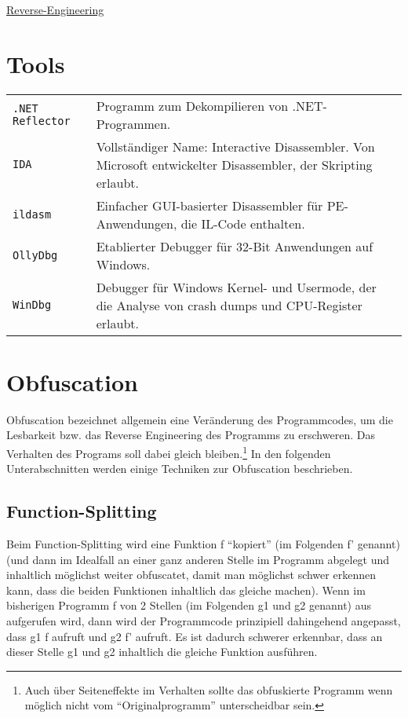 \begin{center}
     \Large{\underline{Reverse-Engineering}} \\
\end{center}

\section{Tools}
\begin{tabular}{@{}p{\the\MyLen}
		@{}p{\linewidth-\the\MyLen}@{}}
	\texttt{.NET Reflector} & Programm zum Dekompilieren von .NET-Programmen.\\
	\texttt{IDA} &  Vollständiger Name: Interactive Disassembler. Von Microsoft entwickelter Disassembler, der Skripting erlaubt. \\
	\texttt{ildasm} & Einfacher GUI-basierter Disassembler für PE-Anwendungen, die IL-Code enthalten.\\
	\texttt{OllyDbg} & Etablierter Debugger für 32-Bit Anwendungen auf Windows.\\
	\texttt{WinDbg} & Debugger für Windows Kernel- und Usermode, der die Analyse von crash dumps und CPU-Register erlaubt.\\
\end{tabular}
\section{Obfuscation}
Obfuscation bezeichnet allgemein eine Veränderung des Programmcodes, um die Lesbarkeit bzw. das Reverse Engineering des Programms zu erschweren. Das Verhalten des Programs soll dabei gleich bleiben.\footnote{Auch über Seiteneffekte im Verhalten sollte das obfuskierte Programm wenn möglich nicht vom \enquote{Originalprogramm} unterscheidbar sein.} In den folgenden Unterabschnitten werden einige Techniken zur Obfuscation beschrieben.
\subsection{Function-Splitting}
Beim Function-Splitting wird eine Funktion f \enquote{kopiert} (im Folgenden f' genannt) (und dann im Idealfall an einer ganz anderen Stelle im Programm abgelegt und inhaltlich möglichst weiter obfuscatet, damit man möglichst schwer erkennen kann, dass die beiden Funktionen inhaltlich das gleiche machen). Wenn im bisherigen Programm f von 2 Stellen (im Folgenden g1 und g2 genannt) aus aufgerufen wird, dann wird der Programmcode prinzipiell dahingehend angepasst, dass g1 f aufruft und g2 f' aufruft. Es ist dadurch schwerer erkennbar, dass an dieser Stelle g1 und g2 inhaltlich die gleiche Funktion ausführen.
